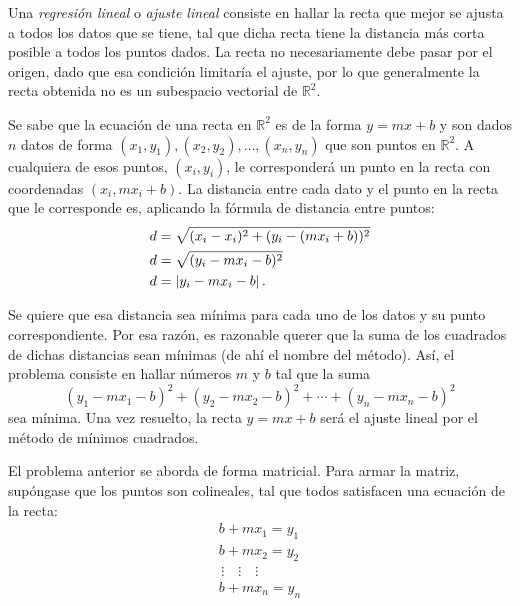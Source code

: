 \documentclass{fmbnotes}
\begin{document}
Una \emph{regresión lineal} o \emph{ajuste lineal} consiste en hallar la recta que mejor se ajusta a todos los datos que se tiene, tal que dicha recta tiene la distancia más corta posible a todos los puntos dados. La recta no necesariamente debe pasar por el origen, dado que esa condición limitaría el ajuste, por lo que generalmente la recta obtenida no es un subespacio vectorial de \(\mathbb{R}^{2}\).

Se sabe que la ecuación de una recta en \(\mathbb{R}^{2}\) es de la forma \(y=mx+b\) y son dados \(n\) datos de forma \((x_1,y_1),(x_2,y_2),\ldots,(x_n,y_n)\) que son puntos en \(\mathbb{R}^{2}\). A cualquiera de esos puntos, \((x_i,y_i)\), le corresponderá un punto en la recta con coordenadas \((x_i, mx_i+b)\). La distancia entre cada dato y el punto en la recta que le corresponde es, aplicando la fórmula de distancia entre puntos:
\begin{align*}
	d &= \sqrt{(x_i-x_i)^2+(y_i-(mx_i+b))^2}\notag \\
	d &= \sqrt{(y_i-mx_i-b)^2} \notag \\
	d &= \left|y_i-mx_i-b\right|. \notag 
\end{align*}

Se quiere que esa distancia sea mínima para cada uno de los datos y su punto correspondiente. Por esa razón, es razonable querer que la suma de los cuadrados de dichas distancias sean mínimas (de ahí el nombre del método). Así, el problema consiste en hallar números \(m\) y \(b\) tal que la suma
\[(y_1-mx_1-b)^2+(y_2-mx_2-b)^2+\cdots+(y_n-mx_n-b)^2\]
sea mínima. Una vez resuelto, la recta \(y=mx+b\) será el ajuste lineal por el método de mínimos cuadrados.

El problema anterior se aborda de forma matricial. Para armar la matriz, supóngase que los puntos son colineales, tal que todos satisfacen una ecuación de la recta:
\begin{gather*}
b+mx_1 =y_1  \\
b+mx_2 =y_2  \\
\, \vdots \quad \vdots \quad \vdots \\
b+mx_n =y_n \\
\end{gather*}
\end{document}
